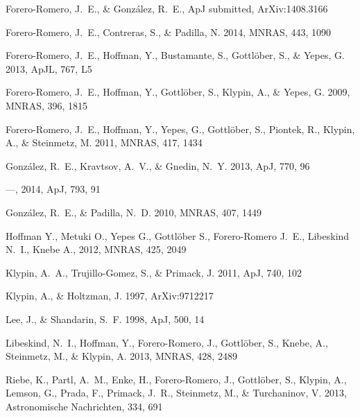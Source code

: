\documentclass{iau}
\newcommand{\apj}{ApJ}
\newcommand{\apjl}{ApJL}
\newcommand{\mnras}{MNRAS}
\begin{document}
\begin{thebibliography}{}


{{Forero-Romero}, J.~E., \& {Gonz{\'a}lez}, R.~E.}, ApJ submitted,
ArXiv:1408.3166 

{Forero-Romero}, J.~E., {Contreras}, S., \& {Padilla}, N. 2014, \mnras, 443,
1090

{Forero-Romero}, J.~E., {Hoffman}, Y., {Bustamante}, S., {Gottl{\"o}ber}, S.,
\& {Yepes}, G. 2013, \apjl, 767, L5

{Forero-Romero}, J.~E., {Hoffman}, Y., {Gottl{\"o}ber}, S., {Klypin}, A., \&
{Yepes}, G. 2009, \mnras, 396, 1815

{Forero-Romero}, J.~E., {Hoffman}, Y., {Yepes}, G., {Gottl{\"o}ber}, S.,
{Piontek}, R., {Klypin}, A., \& {Steinmetz}, M. 2011, \mnras, 417, 1434


{Gonz{\'a}lez}, R.~E., {Kravtsov}, A.~V., \& {Gnedin}, N.~Y. 2013, \apj, 770,
96

---, 2014, \apj, 793, 91


{Gonz{\'a}lez}, R.~E., \& {Padilla}, N.~D. 2010, \mnras, 407, 1449


 {Hoffman} Y., {Metuki} O., {Yepes}
  G., {Gottl{\"o}ber} S., {Forero-Romero} J.~E., {Libeskind} N.~I.,
  {Knebe} A., 2012, \mnras, 425, 2049 

{Klypin}, A.~A., {Trujillo-Gomez}, S., \& {Primack}, J. 2011, \apj,
740, 102

{Klypin}, A., \& {Holtzman}, J. 1997, ArXiv:9712217

{Lee}, J., \& {Shandarin}, S.~F. 1998, \apj, 500, 14

{Libeskind}, N.~I., {Hoffman}, Y., {Forero-Romero}, J., {Gottl{\"o}ber}, S.,
  {Knebe}, A., {Steinmetz}, M., \& {Klypin}, A. 2013, \mnras, 428, 2489

{Riebe}, K., {Partl}, A.~M., {Enke}, H., {Forero-Romero}, J., {Gottl{\"o}ber},
  S., {Klypin}, A., {Lemson}, G., {Prada}, F., {Primack}, J.~R., {Steinmetz},
  M., \& {Turchaninov}, V. 2013, Astronomische Nachrichten, 334, 691



\end{thebibliography}
\end{document}
